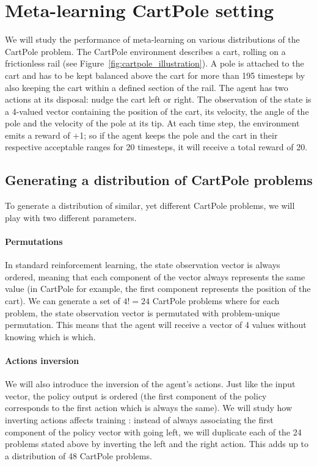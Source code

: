 \section{Meta-learning CartPole setting}
\label{sec:setting}
We will study the performance of meta-learning on various distributions of 
the CartPole problem. The CartPole environment describes a cart, rolling on 
a frictionless rail (see Figure~\ref{fig:cartpole_illustration}). 
A pole is attached to the cart and has to be kept balanced
above the cart for more than 195 timesteps by also keeping the cart within a 
defined section of the rail. The agent has two actions at its disposal: nudge
the cart left or right. The observation of the state is a 4-valued vector 
containing the position of the cart, its velocity, the angle of the pole and
the velocity of the pole at its tip. At each time step, the environment emits
a reward of +1; so if the agent keeps the pole and the cart in their 
respective acceptable ranges for 20 timesteps, it will receive a total reward
of 20.\\


\subsection{Generating a distribution of CartPole problems}
To generate a distribution of similar, yet different CartPole problems, we
will play with two different parameters.

\paragraph{Permutations} In standard reinforcement learning, the state
observation vector is always ordered, meaning that each component of the vector
always represents the same value (in CartPole for example, the first component
represents the position of the cart). We can generate a set of $4! = 24$
CartPole problems where for each problem, the state observation vector is
permutated with problem-unique permutation. This means that the agent will
receive a vector of 4 values without knowing which is which.

\paragraph{Actions inversion} We will also introduce the inversion of the
agent's actions. Just like the input vector, the policy output is ordered
(the first component of the policy corresponds to the first action which is
always the same). We will study how inverting actions affects training : instead
of always associating the first component of the policy vector with going left,
we will duplicate each of the 24 problems stated above by inverting the left
and the right action. This adds up to a distribution of 48 CartPole problems.

